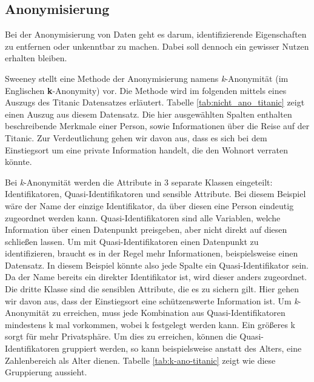 \subsection{Anonymisierung}

Bei der Anonymisierung von Daten geht es darum, identifizierende Eigenschaften zu entfernen oder unkenntbar zu machen.
Dabei soll dennoch ein gewisser Nutzen erhalten bleiben. 

Sweeney \cite{P-23} stellt eine Methode der Anonymisierung namens \textit{k}-Anonymität (im Englischen \textbf{k}-Anonymity) vor.
Die Methode wird im folgenden mittels eines Auszugs des Titanic Datensatzes \cite{D-titanic} erläutert.
Tabelle \ref{tab:nicht_ano_titanic} zeigt einen Auszug aus diesem Datensatz.
Die hier ausgewählten Spalten enthalten beschreibende Merkmale einer Person, sowie Informationen über die Reise auf der Titanic. 
Zur Verdeutlichung gehen wir davon aus, dass es sich bei dem Einstiegsort um eine private Information handelt, die den Wohnort verraten könnte.



Bei \textit{k}-Anonymität werden die Attribute in 3 separate Klassen eingeteilt: Identifikatoren, Quasi-Identifikatoren und sensible Attribute.
Bei diesem Beispiel wäre der Name der einzige Identifikator, da über diesen eine Person eindeutig zugeordnet werden kann. 
Quasi-Identifikatoren sind alle Variablen, welche Information über einen Datenpunkt preisgeben, aber nicht direkt auf diesen schließen lassen. 
Um mit Quasi-Identifikatoren einen Datenpunkt zu identifizieren, braucht es in der Regel mehr Informationen, beispielsweise einen Datensatz.
In diesem Beispiel könnte also jede Spalte ein Quasi-Identifikator sein.
Da der Name bereits ein direkter Identifikator ist, wird dieser anders zugeordnet.
Die dritte Klasse sind die sensiblen Attribute, die es zu sichern gilt. 
Hier gehen wir davon aus, dass der Einstiegsort eine schützenswerte Information ist.
Um \textit{k}-Anonymität zu erreichen, muss jede Kombination aus Quasi-Identifikatoren mindestens k mal vorkommen, wobei k festgelegt werden kann. 
Ein größeres k sorgt für mehr Privatsphäre.
Um dies zu erreichen, können die Quasi-Identifikatoren gruppiert werden, so kann beispielsweise anstatt des Alters, eine Zahlenbereich als Alter dienen.
Tabelle \ref{tab:k-ano-titanic} zeigt wie diese Gruppierung aussieht.

